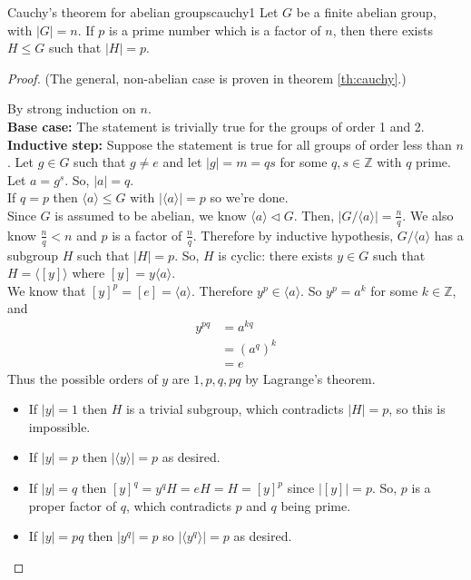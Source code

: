 \documentclass[12pt]{article}
\newcommand{\Z}{\mathbb{Z}}
\begin{document}
	\begin{mythm}{Cauchy's theorem for abelian groups}{cauchy1}
		Let $G$ be a finite abelian group, with $|G|=n$. If $p$ is a prime number which is a factor of $n$, then there exists $H\leq G$ such that $|H|=p$.
		
		\begin{proof}
			(The general, non-abelian case is proven in theorem \ref{th:cauchy}.)
			
			By strong induction on $n$.\\
			
			\textbf{Base case: }The statement is trivially true for the groups of order 1 and 2.\\
			
			\textbf{Inductive step: }Suppose the statement is true for all groups of order less than $n$. Let $g\in G$ such that $g\neq e$ and let $|g|=m=qs$ for some $q, s\in\Z$ with $q$ prime. Let $a=g^s$. So, $|a|=q$.\\
			
			If $q=p$ then $\langle a\rangle\leq G$ with $|\langle a\rangle|=p$ so we're done.\\
			
			Since $G$ is assumed to be abelian, we know $\langle a\rangle\lhd G$. Then, $|G/\langle a\rangle|=\frac{n}{q}$. We also know $\frac{n}{q}<n$ and $p$ is a factor of $\frac{n}{q}$. Therefore by inductive hypothesis, $G/\langle a\rangle$ has a subgroup $H$ such that $|H|=p$. So, $H$ is cyclic: there exists $y\in G$ such that $H=\langle [y]\rangle$ where $[y]=y\langle a\rangle$.\\
			
			We know that $[y]^p=[e]=\langle a\rangle$. Therefore $y^p\in\langle a\rangle$. So $y^p=a^k$ for some $k\in\Z$, and
			\begin{align*}
				y^{pq}&=a^{kq}\\&=(a^q)^k\\
				&=e
			\end{align*}
			Thus the possible orders of $y$ are $1, p, q, pq$ by Lagrange's theorem.
			\begin{itemize}
				\item If $|y|=1$ then $H$ is a trivial subgroup, which contradicts $|H|=p$, so this is impossible.
				\item If $|y|=p$ then $|\langle y\rangle|=p$ as desired.
				\item If $|y|=q$ then $[y]^q=y^qH=eH=H=[y]^p$ since $|[y]|=p$. So, $p$ is a proper factor of $q$, which contradicts $p$ and $q$ being prime.
				\item If $|y|=pq$ then $|y^q|=p$ so $|\langle y^q\rangle|=p$ as desired.
			\end{itemize}
		\end{proof}
	\end{mythm}
	
\end{document}
